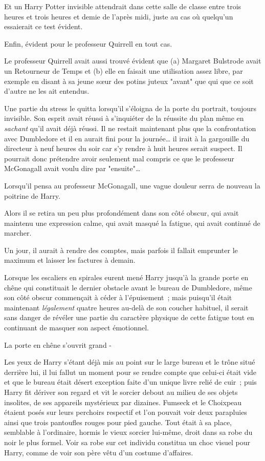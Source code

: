 Et un Harry Potter invisible attendrait dans cette salle de classe entre trois heures et trois heures et demie de l'après midi, juste au cas où quelqu'un essaierait ce test évident.

Enfin, évident pour le professeur Quirrell en tout cas.

Le professeur Quirrell avait aussi trouvé évident que (a) Margaret Bulstrode avait un Retourneur de Temps et (b) elle en faisait une utilisation assez libre, par exemple en disant à sa jeune sœur des potins juteux "avant" que qui que ce soit d'autre ne les ait entendus.

Une partie du stress le quitta lorsqu'il s'éloigna de la porte du portrait, toujours invisible. Son esprit avait réussi à s'inquiéter de la réussite du plan même en \emph{sachant} qu'il avait déjà réussi. Il ne restait maintenant plus que la confrontation avec Dumbledore et il en aurait fini pour la journée… il irait à la gargouille du directeur à neuf heures du soir car s'y rendre à huit heures serait suspect. Il pourrait donc prétendre avoir seulement mal compris ce que le professeur McGonagall avait voulu dire par "ensuite"…

Lorsqu'il pensa au professeur McGonagall, une vague douleur serra de nouveau la poitrine de Harry.

Alors il se retira un peu plus profondément dans son côté obscur, qui avait maintenu une expression calme, qui avait masqué la fatigue, qui avait continué de marcher.

Un jour, il aurait à rendre des comptes, mais parfois il fallait emprunter le maximum et laisser les factures à demain.

\later

Lorsque les escaliers en spirales eurent mené Harry jusqu'à la grande porte en chêne qui constituait le dernier obstacle avant le bureau de Dumbledore, même son côté obscur commençait à céder à l'épuisement~; mais puisqu'il était maintenant \emph{légalement} quatre heures au-delà de son coucher habituel, il serait sans danger de révéler une partie du caractère physique de cette fatigue tout en continuant de masquer son aspect émotionnel.

La porte en chêne s'ouvrit grand -

Les yeux de Harry s'étant déjà mis au point sur le large bureau et le trône situé derrière lui, il lui fallut un moment pour se rendre compte que celui-ci était vide et que le bureau était désert exception faite d'un unique livre relié de cuir~; puis Harry fit dériver son regard et vit le sorcier debout au milieu de ses objets insolites, de ses appareils mystérieux par dizaines. Fumseck et le Choixpeau étaient posés sur leurs perchoirs respectif et l'on pouvait voir deux parapluies ainsi que trois pantoufles rouges pour pied gauche. Tout était à sa place, semblable à l'ordinaire, hormis le vieux sorcier lui-même, droit dans sa robe du noir le plus formel. Voir sa robe sur cet individu constitua un choc visuel pour Harry, comme de voir son père vêtu d'un costume d'affaires.

